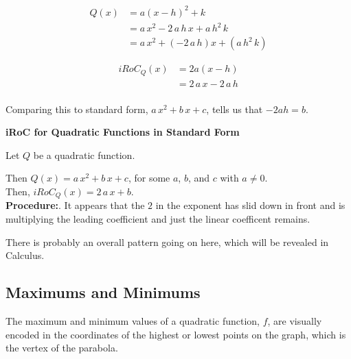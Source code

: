 \documentclass{ximera}
\begin{document}
\begin{align*}
Q(x) & = a (x - h)^2 + k \\
     & = a \, x^2 - 2 \, a \, h \, x + a \, h^2 \, k \\
     & = a \, x^2  + (- 2 \, a \, h) x + (a \, h^2 \, k) 
\end{align*}


\begin{align*}
iRoC_Q(x) &= 2 a (x - h) \\
          & = 2 \, a \, x - 2 \, a \, h  \\
\end{align*}


Comparing this to standard form, $a \, x^2 + b \, x + c$, tells us that $-2ah = b$. \\


\begin{procedure} \textbf{\textcolor{blue!75!black}{iRoC for Quadratic Functions in Standard Form}} 



Let $Q$ be a quadratic function.

Then $Q(x) = a \, x^2 + b \, x + c$, for some $a$, $b$, and $c$ with $a \ne 0$. \\

Then, $iRoC_Q(x) = 2 \, a \, x + b$. \\


\textbf{Procedure:}. It appears that the $2$ in the exponent has slid down in front and is multiplying the leading coefficient and just the linear coefficent remains. 



\end{procedure}

There is probably an overall pattern going on here, which will be revealed in Calculus. \\












\subsection*{Maximums and Minimums}




The maximum and minimum values of a quadratic function, $f$, are visually encoded in the coordinates of the highest or lowest points on the  graph, which is the vertex of the parabola.
\end{document}
